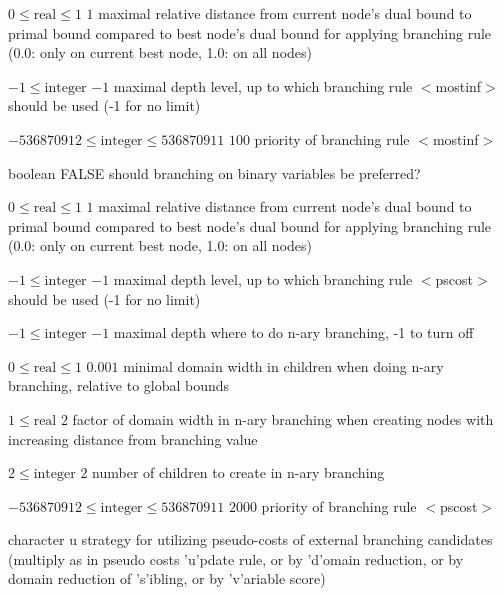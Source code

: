 %
{$0\leq\textrm{real}\leq1$}%
{$1$}%
{maximal relative distance from current node's dual bound to primal bound compared to best node's dual bound for applying branching rule (0.0: only on current best node, 1.0: on all nodes)}%
{}

%
{$-1\leq\textrm{integer}$}%
{$-1$}%
{maximal depth level, up to which branching rule $<$mostinf$>$ should be used (-1 for no limit)}%
{}

%
{$-536870912\leq\textrm{integer}\leq536870911$}%
{$100$}%
{priority of branching rule $<$mostinf$>$}%
{}

%
{boolean}%
{FALSE}%
{should branching on binary variables be preferred?}%
{}

%
{$0\leq\textrm{real}\leq1$}%
{$1$}%
{maximal relative distance from current node's dual bound to primal bound compared to best node's dual bound for applying branching rule (0.0: only on current best node, 1.0: on all nodes)}%
{}

%
{$-1\leq\textrm{integer}$}%
{$-1$}%
{maximal depth level, up to which branching rule $<$pscost$>$ should be used (-1 for no limit)}%
{}

%
{$-1\leq\textrm{integer}$}%
{$-1$}%
{maximal depth where to do n-ary branching, -1 to turn off}%
{}

%
{$0\leq\textrm{real}\leq1$}%
{$0.001$}%
{minimal domain width in children when doing n-ary branching, relative to global bounds}%
{}

%
{$1\leq\textrm{real}$}%
{$2$}%
{factor of domain width in n-ary branching when creating nodes with increasing distance from branching value}%
{}

%
{$2\leq\textrm{integer}$}%
{$2$}%
{number of children to create in n-ary branching}%
{}

%
{$-536870912\leq\textrm{integer}\leq536870911$}%
{$2000$}%
{priority of branching rule $<$pscost$>$}%
{}

%
{character}%
{u}%
{strategy for utilizing pseudo-costs of external branching candidates (multiply as in pseudo costs 'u'pdate rule, or by 'd'omain reduction, or by domain reduction of 's'ibling, or by 'v'ariable score)}%
{}

